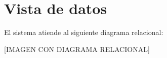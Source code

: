 \chapter{Vista de datos}

El sistema atiende al siguiente diagrama relacional:

[IMAGEN CON DIAGRAMA RELACIONAL]